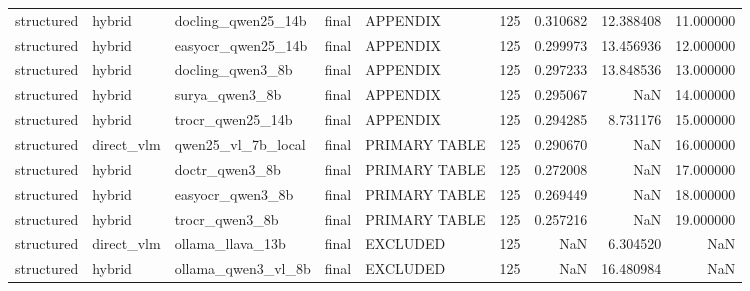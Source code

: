 \begin{tabular}{lllllrrrr}
structured & hybrid & docling\_qwen25\_14b & final & APPENDIX & 125 & 0.310682 & 12.388408 & 11.000000 \\
structured & hybrid & easyocr\_qwen25\_14b & final & APPENDIX & 125 & 0.299973 & 13.456936 & 12.000000 \\
structured & hybrid & docling\_qwen3\_8b & final & APPENDIX & 125 & 0.297233 & 13.848536 & 13.000000 \\
structured & hybrid & surya\_qwen3\_8b & final & APPENDIX & 125 & 0.295067 & NaN & 14.000000 \\
structured & hybrid & trocr\_qwen25\_14b & final & APPENDIX & 125 & 0.294285 & 8.731176 & 15.000000 \\
structured & direct\_vlm & qwen25\_vl\_7b\_local & final & PRIMARY TABLE & 125 & 0.290670 & NaN & 16.000000 \\
structured & hybrid & doctr\_qwen3\_8b & final & PRIMARY TABLE & 125 & 0.272008 & NaN & 17.000000 \\
structured & hybrid & easyocr\_qwen3\_8b & final & PRIMARY TABLE & 125 & 0.269449 & NaN & 18.000000 \\
structured & hybrid & trocr\_qwen3\_8b & final & PRIMARY TABLE & 125 & 0.257216 & NaN & 19.000000 \\
structured & direct\_vlm & ollama\_llava\_13b & final & EXCLUDED & 125 & NaN & 6.304520 & NaN \\
structured & hybrid & ollama\_qwen3\_vl\_8b & final & EXCLUDED & 125 & NaN & 16.480984 & NaN \\
\bottomrule
\end{tabular}

